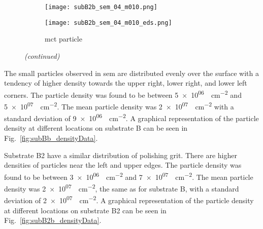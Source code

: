 \begin{figure}[htbp]
\ContinuedFloat
    \centering
    \begin{subfigure}[t]{\textwidth}
          \begin{minipage}[t]{0.49\linewidth}
            \centering
            \texttt{[image: subB2b\_sem\_04\_m010.png]}
          \end{minipage}
          \hfill
          \begin{minipage}[t]{0.49\linewidth}
            \centering
            \texttt{[image: subB2b\_sem\_04\_m010\_eds.png]}
          \end{minipage}
        \caption{\Ac{mct} particle}\label{fig:subB2b_mct}
    \end{subfigure}
    \captionsetup{list=no}
    \caption{\emph{(continued)}}
\end{figure}

The small particles observed in \ac{sem} are distributed evenly over the surface with a tendency of higher density towards the upper right, lower right, and lower left corners. The particle density was found to be between \SI{5e+06}{\particle\centi\metre^{-2}} and \SI{5e+07}{\particle\centi\metre^{-2}}. The mean particle density was \SI{2e+07}{\particle\centi\metre^{-2}} with a standard deviation of \SI{9e+06}{\particle\centi\metre^{-2}}. A graphical representation of the particle density at different locations on substrate B can be seen in Fig.~\ref{fig:subBb_densityData}.

Substrate B2 have a similar distribution of polishing grit. There are higher densities of particles near the left and upper edges. The particle density was found to be between \SI{3e+06}{\particle\centi\metre^{-2}} and \SI{7e+07}{\particle\centi\metre^{-2}}. The mean particle density was \SI{2e+07}{\particle\centi\metre^{-2}}, the same as for substrate B, with a standard deviation of \SI{2e+07}{\particle\centi\metre^{-2}}. A graphical representation of the particle density at different locations on substrate B2 can be seen in Fig.~\ref{fig:subB2b_densityData}.

